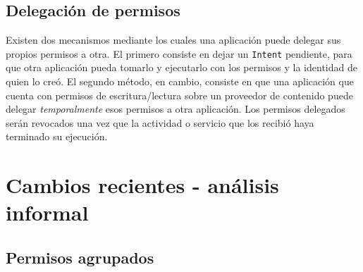 \subsection*{Delegación de permisos}
Existen dos mecanismos mediante los cuales una aplicación puede delegar sus propios permisos a otra. El
primero consiste en dejar un \texttt{Intent} pendiente, para que otra aplicación pueda tomarlo y
ejecutarlo con los permisos y la identidad de quien lo creó. El segundo método, en cambio, consiste en
que una aplicación que cuenta con permisos de escritura/lectura sobre un proveedor de contenido puede
delegar \textit{temporalmente} esos permisos a otra aplicación. Los permisos delegados serán revocados
una vez que la actividad o servicio que los recibió haya terminado su ejecución.

\section{Cambios recientes - análisis informal}
\label{section:recent-changes}
\subsection{Permisos agrupados}
\label{subsection:recent-changes:grouped-permissions}